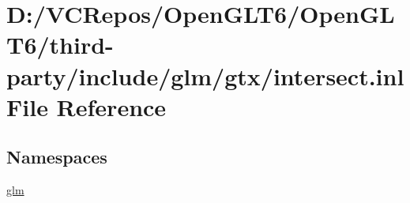\hypertarget{intersect_8inl}{}\section{D\+:/\+V\+C\+Repos/\+Open\+G\+L\+T6/\+Open\+G\+L\+T6/third-\/party/include/glm/gtx/intersect.inl File Reference}
\label{intersect_8inl}
\subsection*{Namespaces}
\begin{DoxyCompactItemize}
\item 
 \mbox{\hyperlink{namespaceglm}{glm}}
\end{DoxyCompactItemize}
